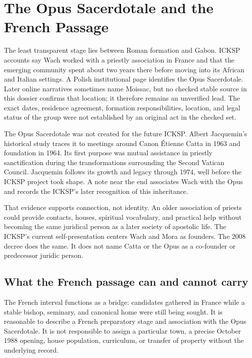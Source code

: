 \section{The Opus Sacerdotale and the French Passage}

The least transparent stage lies between Roman formation and Gabon. ICKSP accounts say Wach worked with a priestly association in France and that the emerging community spent about two years there before moving into its African and Italian settings. A Polish institutional page identifies the Opus Sacerdotale. Later online narratives sometimes name Moissac, but no checked stable source in this dossier confirms that location; it therefore remains an unverified lead. The exact dates, residence agreement, formation responsibilities, location, and legal status of the group were not established by an original act in the checked set.

The Opus Sacerdotale was not created for the future ICKSP. Albert Jacquemin's historical study traces it to meetings around Canon Étienne Catta in 1963 and foundation in 1964. Its first purpose was mutual assistance in priestly sanctification during the transformations surrounding the Second Vatican Council. Jacquemin follows its growth and legacy through 1974, well before the ICKSP project took shape. A note near the end associates Wach with the Opus and records the ICKSP's later recognition of this inheritance.

That evidence supports connection, not identity. An older association of priests could provide contacts, houses, spiritual vocabulary, and practical help without becoming the same juridical person as a later society of apostolic life. The ICKSP's current self-presentation centers Wach and Mora as founders. The 2008 decree does the same. It does not name Catta or the Opus as a co-founder or predecessor juridic person.

\subsection{What the French passage can and cannot carry}

The French interval functions as a bridge: candidates gathered in France while a stable bishop, seminary, and canonical home were still being sought. It is reasonable to describe a French preparatory stage and association with the Opus Sacerdotale. It is not responsible to assign a particular town, a precise October 1988 opening, house population, curriculum, or transfer of property without the underlying record.

